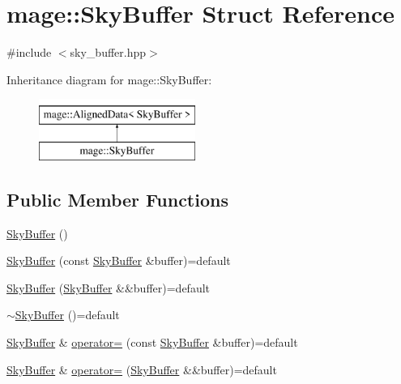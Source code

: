 \hypertarget{structmage_1_1_sky_buffer}{}\section{mage\+:\+:Sky\+Buffer Struct Reference}
\label{structmage_1_1_sky_buffer}


{\ttfamily \#include $<$sky\+\_\+buffer.\+hpp$>$}

Inheritance diagram for mage\+:\+:Sky\+Buffer\+:\begin{figure}[H]
\begin{center}
\leavevmode
\includegraphics[height=2.000000cm]{structmage_1_1_sky_buffer}
\end{center}
\end{figure}
\subsection*{Public Member Functions}
\begin{DoxyCompactItemize}
\item 
\hyperlink{structmage_1_1_sky_buffer_ab78f7f7ade478aeef620088009e6942d}{Sky\+Buffer} ()
\item 
\hyperlink{structmage_1_1_sky_buffer_a025aa6d0e74bbcc765fdb778d69ae68b}{Sky\+Buffer} (const \hyperlink{structmage_1_1_sky_buffer}{Sky\+Buffer} \&buffer)=default
\item 
\hyperlink{structmage_1_1_sky_buffer_afe4eacb2f2a838d5a2deb274d27a8d91}{Sky\+Buffer} (\hyperlink{structmage_1_1_sky_buffer}{Sky\+Buffer} \&\&buffer)=default
\item 
\hyperlink{structmage_1_1_sky_buffer_a3e18894ef312290047215f276a2cb0bd}{$\sim$\+Sky\+Buffer} ()=default
\item 
\hyperlink{structmage_1_1_sky_buffer}{Sky\+Buffer} \& \hyperlink{structmage_1_1_sky_buffer_a537fb2efe24495b1c84d683437759e93}{operator=} (const \hyperlink{structmage_1_1_sky_buffer}{Sky\+Buffer} \&buffer)=default
\item 
\hyperlink{structmage_1_1_sky_buffer}{Sky\+Buffer} \& \hyperlink{structmage_1_1_sky_buffer_a8210a03487bdc44694fef925bb85ed71}{operator=} (\hyperlink{structmage_1_1_sky_buffer}{Sky\+Buffer} \&\&buffer)=default
\end{DoxyCompactItemize}
